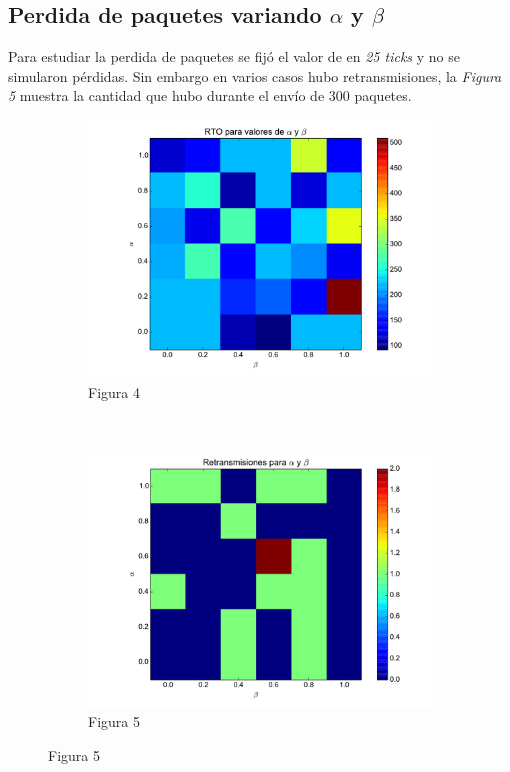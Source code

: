     \subsection{Perdida de paquetes variando $\alpha$ y $\beta$}
        Para estudiar la perdida de paquetes se fij\'o el valor
        de \rto{} en \textit{25 ticks} y no se simularon p\'erdidas.
        Sin embargo en varios casos hubo retransmisiones, la 
        \textit{Figura 5} muestra la cantidad que hubo durante el env\'io de 300
		paquetes.        
    \begin{figure}[H]
	    \center
	    \begin{subfigure}{0.45\textwidth}
		    \includegraphics[width=1.0\textwidth]{imagenes/rto_vs_alphaBeta.pdf}
		    \caption*{Figura 4}
	    \end{subfigure}
	    ~
	    \begin{subfigure}{0.45\textwidth}
		    \includegraphics[width=1.0\textwidth]{imagenes/retransmisiones_300.pdf}
		    \caption*{Figura 5}
	    \end{subfigure}
    \end{figure}

